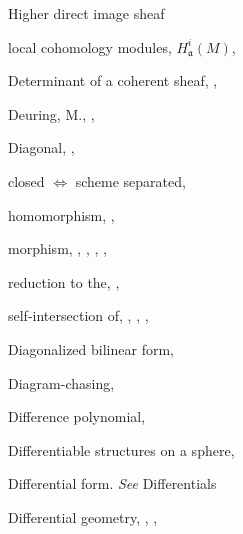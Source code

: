 {{\noindent\hspace*{15.0bp}Higher direct image sheaf\par
\noindent\hspace*{7.5bp}local cohomology modules, $H^i_{\mathfrak a}(M)$, \par
\noindent\hspace*{0.0bp}Determinant of a coherent sheaf, , \par
\noindent\hspace*{0.0bp}Deuring, M., , \par
\noindent\hspace*{0.0bp}Diagonal, , \par
\noindent\hspace*{7.5bp}closed $\Leftrightarrow$ scheme separated, \par
\noindent\hspace*{7.5bp}homomorphism, , \par
\noindent\hspace*{7.5bp}morphism, , , , , \par
\noindent\hspace*{7.5bp}reduction to the, , \par
\noindent\hspace*{7.5bp}self-intersection of, , , , \par
\noindent\hspace*{0.0bp}Diagonalized bilinear form, \par
\noindent\hspace*{0.0bp}Diagram-chasing, \par
\noindent\hspace*{0.0bp}Difference polynomial, \par
\noindent\hspace*{0.0bp}Differentiable structures on a sphere, \par
\noindent\hspace*{0.0bp}Differential form. \emph{See} Differentials\par
\noindent\hspace*{0.0bp}Differential geometry, , , \par
}}
